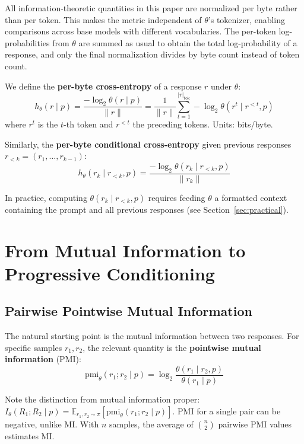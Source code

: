 \documentclass[11pt]{article}
\newcommand{\E}{\mathbb{E}}
\newcommand{\pmi}{\mathrm{pmi}}
\begin{document}
All information-theoretic quantities in this paper are normalized per byte rather than per token. This makes the metric independent of $\theta$'s tokenizer, enabling comparisons across base models with different vocabularies. The per-token log-probabilities from $\theta$ are summed as usual to obtain the total log-probability of a response, and only the final normalization divides by byte count instead of token count.

We define the \textbf{per-byte cross-entropy} of a response $r$ under $\theta$:
\begin{equation}\label{eq:pertok}
    h_\theta(r \mid p) = \frac{-\log_2 \theta(r \mid p)}{\|r\|} = \frac{1}{\|r\|}\sum_{t=1}^{|r|_{\mathrm{tok}}} -\log_2 \theta(r^t \mid r^{<t}, p)
\end{equation}
where $r^t$ is the $t$-th token and $r^{<t}$ the preceding tokens. Units: bits/byte.

Similarly, the \textbf{per-byte conditional cross-entropy} given previous responses $r_{<k} = (r_1, \ldots, r_{k-1})$:
\begin{equation}\label{eq:condpertok}
    h_\theta(r_k \mid r_{<k}, p) = \frac{-\log_2 \theta(r_k \mid r_{<k}, p)}{\|r_k\|}
\end{equation}

In practice, computing $\theta(r_k \mid r_{<k}, p)$ requires feeding $\theta$ a formatted context containing the prompt and all previous responses (see Section~\ref{sec:practical}).

\section{From Mutual Information to Progressive Conditioning}

\subsection{Pairwise Pointwise Mutual Information}

The natural starting point is the mutual information between two responses. For specific samples $r_1, r_2$, the relevant quantity is the \textbf{pointwise mutual information} (PMI):
\begin{equation}
    \pmi_\theta(r_1; r_2 \mid p) = \log_2 \frac{\theta(r_1 \mid r_2, p)}{\theta(r_1 \mid p)}
\end{equation}

Note the distinction from mutual information proper: $I_\theta(R_1; R_2 \mid p) = \E_{r_1, r_2 \sim \pi}[\pmi_\theta(r_1; r_2 \mid p)]$. PMI for a single pair can be negative, unlike MI. With $n$ samples, the average of $\binom{n}{2}$ pairwise PMI values estimates MI.
\end{document}
